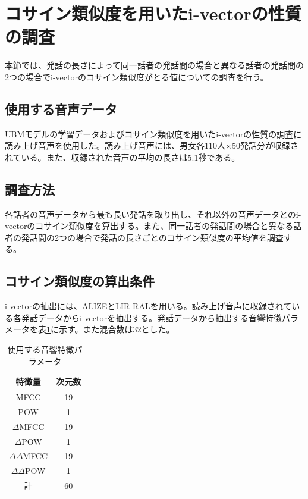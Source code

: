 \section{コサイン類似度を用いたi-vectorの性質の調査}
\label{section:pre_cos}
本節では、発話の長さによって同一話者の発話間の場合と異なる話者の発話間の2つの場合でi-vectorのコサイン類似度がとる値についての調査を行う。

\subsection{使用する音声データ}
\label{section:detail_ATR}
UBMモデルの学習データおよびコサイン類似度を用いたi-vectorの性質の調査に読み上げ音声\cite{ATR}を使用した。読み上げ音声には、男女各110人$×$50発話分が収録されている。また、収録された音声の平均の長さは5.1秒である。

\subsection{調査方法}
各話者の音声データから最も長い発話を取り出し、それ以外の音声データとのi-vectorのコサイン類似度を算出する。また、同一話者の発話間の場合と異なる話者の発話間の2つの場合で発話の長さごとのコサイン類似度の平均値を調査する。\par

\subsection{コサイン類似度の算出条件}
i-vectorの抽出には、ALIZEとLIR RAL\cite{alize}を用いる。読み上げ音声\cite{ATR}に収録されている各発話データからi-vectorを抽出する。発話データから抽出する音響特徴パラメータを表\ref{iv_feature}に示す。また混合数は32とした。

\begin{table}[H]
  \begin{center}
    \caption{使用する音響特徴パラメータ}
    \label{iv_feature}
    \begin{tabular}{|c||c|} \hline
      特徴量 & 次元数\\ \hline
      MFCC & 19  \\ 
      POW & 1  \\ 
      $\Delta$MFCC & 19 \\ 
      $\Delta$POW & 1 \\ 
      $\Delta\Delta$MFCC & 19 \\ 
      $\Delta\Delta$POW & 1 \\ \hline
      計 & 60 \\ \hline
    \end{tabular}
  \end{center}
\end{table}

